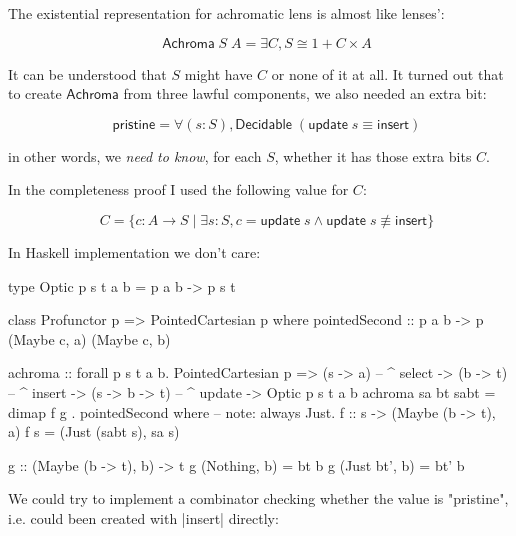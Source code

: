 \documentclass{article}
\begin{document}
The existential representation for achromatic lens is almost like lenses':

\begin{equation}
\quad \mathsf{Achroma}\;S\;A = \exists C, S \cong 1 + C \times A
\end{equation}

It can be understood that $S$ might have $C$ or none of it at all.
It turned out that to create $\mathsf{Achroma}$ from three lawful components,
we also needed an extra bit:

\begin{equation}
\quad \mathsf{pristine} = \forall (s : S), \mathsf{Decidable}\;(\mathsf{update}\;s\equiv\mathsf{insert})
\end{equation}

in other words, we \emph{need to know}, for each $S$, whether it has those
extra bits $C$.

In the completeness proof I used the following value for $C$:

\begin{equation}
  \quad C = \{ c : A \to S \mid
  \exists s : S, c = \mathsf{update}\;s \land \mathsf{update}\; s \not\equiv \mathsf{insert}
  \}
\end{equation}

In Haskell implementation we don't care:

\begin{code}
type Optic p s t a b = p a b -> p s t

class Profunctor p => PointedCartesian p where
    pointedSecond :: p a b -> p (Maybe c, a) (Maybe c, b)

achroma
    :: forall p s t a b. PointedCartesian p
    => (s -> a)       -- ^ select
    -> (b -> t)       -- ^ insert
    -> (s -> b -> t)  -- ^ update
    -> Optic p s t a b
achroma sa bt sabt
    = dimap f g
    . pointedSecond
  where
    -- note: always Just.
    f :: s -> (Maybe (b -> t), a)
    f s = (Just (sabt s), sa s)

    g :: (Maybe (b -> t), b) -> t
    g (Nothing,  b) = bt b
    g (Just bt', b) = bt' b
\end{code}

We could try to implement a combinator checking whether the value is "pristine",
i.e. could been created with |insert| directly:

\end{document}
